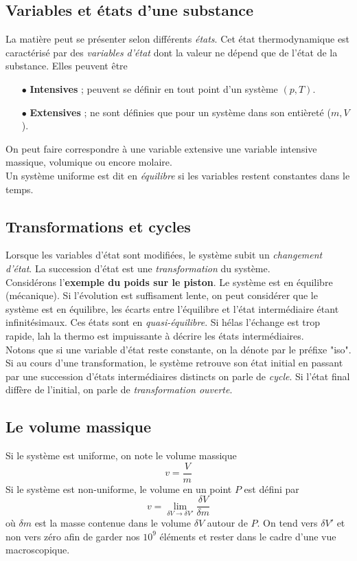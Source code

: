 	\subsection{Variables et états d'une substance}
	La matière peut se présenter selon différents \textit{états}. Cet 
	état thermodynamique est caractérisé par des \textit{variables d'état} 
	dont la valeur ne dépend que de l'état de la substance. Elles peuvent 
	être
	\begin{itemize}
	\item[$\bullet$] \textbf{Intensives} ; peuvent se définir en tout point 
	d'un système $(p, T)$.
	\item[$\bullet$] \textbf{Extensives} ; ne sont définies que pour un 
	système dans son entièreté ($m, V$).
	\end{itemize}
	On peut faire correspondre à une variable extensive une variable intensive 
	massique, volumique ou encore molaire.\\
	Un système uniforme est dit en \textit{équilibre} si les variables 
	restent constantes dans le temps.
	
	
	\subsection{Transformations et cycles}
	Lorsque les variables d'état sont modifiées, le système subit un \textit{
	changement d'état}. La succession d'état est une \textit{transformation} 
	du système. \\
	Considérons l'\textbf{exemple du poids sur le piston}. Le système est 
	en équilibre (mécanique). Si l'évolution est suffisament lente, on peut 
	considérer que le système est en équilibre, les écarts entre l'équilibre 
	et l'état intermédiaire étant infinitésimaux. Ces états sont en 
	\textit{quasi-équilibre}. Si hélas l'échange est trop rapide, lah la 
	thermo est impuissante à décrire les états intermédiaires.\\
	Notons que si une variable d'état reste constante, on la dénote par le 
	préfixe "iso".\\
	
	Si au cours d'une transformation, le système retrouve son état initial en 
	passant par une succession d'états intermédiaires distincts on parle de 
	\textit{cycle}. Si l'état final diffère de l'initial, on parle de \textit{
	transformation ouverte}.
	
	
	\subsection{Le volume massique}
	Si le système est uniforme, on note le volume massique 
	\begin{equation}
	v = \frac{V}{m}
	\end{equation}
	Si le système est non-uniforme, le volume en un point $P$ est défini 
	par
	\begin{equation}
	v = \lim\limits_{\delta V \rightarrow \delta V'} \frac{\delta V}{
	\delta m}
	\end{equation}
	où $\delta m$ est la masse contenue dans le volume $\delta V$ autour 
	de $P$. On tend vers $\delta V'$ et non vers zéro afin de garder nos 
	$10^9$ éléments et rester dans le cadre d'une vue macroscopique.
	
